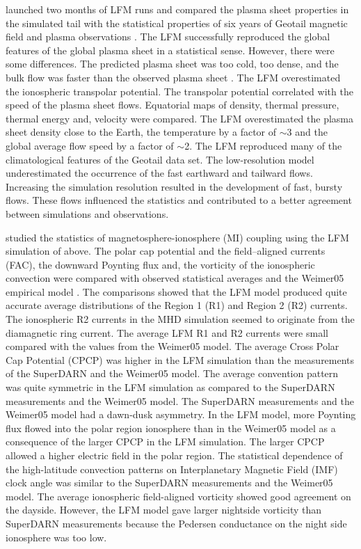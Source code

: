 \documentclass[draft]{agujournal2019}
\begin{document}
 launched two months of LFM runs and compared the plasma sheet properties in the simulated tail with the statistical properties of six years of Geotail magnetic field and plasma observations \cite{kokubun94:_geotail_magnet_field_exper,mukai94:_low_energ_partic_lep_exper_geotail_satel}. The LFM successfully reproduced the global features of the global plasma sheet in a statistical sense. However, there were some differences. The predicted plasma sheet was too cold, too dense, and the bulk flow was faster than the observed plasma sheet \cite{kokubun94:_geotail_magnet_field_exper,mukai94:_low_energ_partic_lep_exper_geotail_satel}. The LFM overestimated the ionospheric transpolar potential. The transpolar potential correlated with the speed of the plasma sheet flows. Equatorial maps of density, thermal pressure, thermal energy and, velocity were compared. The LFM overestimated the plasma sheet density close to the Earth, the temperature by a factor of $\sim$3 and the global average flow speed by a factor of $\sim$2. The LFM reproduced many of the climatological features of the Geotail data set. The low-resolution model underestimated the occurrence of the fast earthward and tailward flows. Increasing the simulation resolution resulted in the development of fast, bursty flows. These flows influenced the statistics and contributed to a better agreement between simulations and observations.

 studied the statistics of magnetosphere-ionosphere (MI) coupling using the LFM simulation of  above. The polar cap potential and the field--aligned currents (FAC), the downward Poynting flux and, the vorticity of the ionospheric convection were compared with observed statistical averages and the Weimer05 empirical model \cite{weimer05:_improv_joule}. The comparisons showed that the LFM model produced quite accurate average distributions of the Region 1 (R1) and Region 2 (R2) currents. The ionospheric R2 currents in the MHD simulation seemed to originate from the diamagnetic ring current. The average LFM R1 and R2 currents were small compared with the values from the Weimer05 model. The average Cross Polar Cap Potential (CPCP) was higher in the LFM simulation than the measurements of the SuperDARN and the Weimer05 model. The average convention pattern was quite symmetric in the LFM simulation as compared to the SuperDARN measurements and the Weimer05 model. The SuperDARN measurements and the Weimer05 model had a dawn-dusk asymmetry. In the LFM model, more Poynting flux flowed into the polar region ionosphere than in the Weimer05 model as a consequence of the larger CPCP in the LFM simulation. The larger CPCP allowed a higher electric field in the polar region. The statistical dependence of the high-latitude convection patterns on Interplanetary Magnetic Field (IMF) clock angle was similar to the SuperDARN measurements \cite{sofko95:_direc_super} and the Weimer05 model. The average ionospheric field-aligned vorticity showed good agreement on the dayside. However, the LFM model gave larger nightside vorticity than SuperDARN measurements because the Pedersen conductance on the night side ionosphere was too low. 
\end{document}
